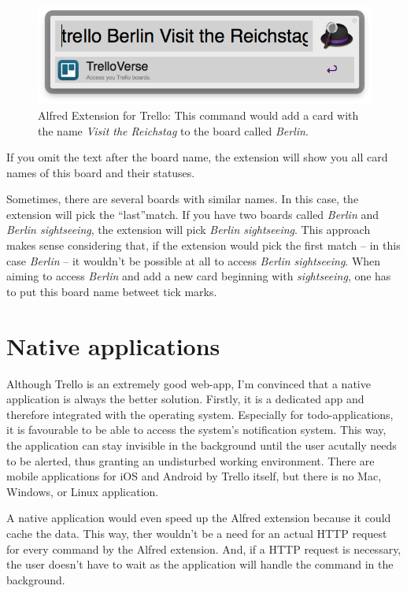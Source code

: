 \begin{figure}[htb]
\centering
\includegraphics[width=\textwidth]{figures/trello-ext.png}
\caption{Alfred Extension for Trello: This command would add a card with the name \emph{Visit the Reichstag} to the board called \emph{Berlin}.}
\label{fig:trello-ext}
\end{figure}

If you omit the text after the board name, the extension will show you all card names of this board and their statuses.

Sometimes, there are several boards with similar names. In this case, the extension will pick the \textquotedblleft last\textquotedblright match. If you have two boards called \emph{Berlin} and \emph{Berlin sightseeing}, the extension will pick \emph{Berlin sightseeing}. This approach makes sense considering that, if the extension would pick the first match -- in this case \emph{Berlin} -- it wouldn't be possible at all to access \emph{Berlin sightseeing}. When aiming to access \emph{Berlin} and add a new card beginning with \emph{sightseeing}, one has to put this board name betweet tick marks.

\section{Native applications}
Although Trello is an extremely good web-app, I'm convinced that a native application is always the better solution. Firstly, it is a dedicated app and therefore integrated with the operating system. Especially for todo-applications, it is favourable to be able to access the system's notification system. This way, the application can stay invisible in the background until the user acutally needs to be alerted, thus granting an undisturbed working environment. There are mobile applications for iOS \cite{trello:ios} and Android \cite{trello:android} by Trello itself, but there is no Mac, Windows, or Linux application.

A native application would even speed up the Alfred extension because it could cache the data. This way, ther wouldn't be a need for an actual HTTP request for every command by the Alfred extension. And, if a HTTP request is necessary, the user doesn't have to wait as the application will handle the command in the background.